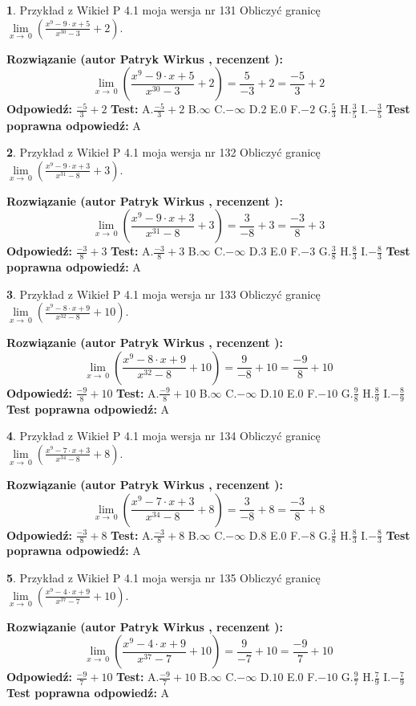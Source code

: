 \documentclass[12pt, a4paper]{article}
\theoremstyle{definition} %
\newtheorem{zad}{}
\newcommand{\zadStart}[1]{\begin{zad}#1\newline}
\newcommand{\zadStop}{\end{zad}}
\newcommand{\rozwStart}[2]{\noindent \textbf{Rozwiązanie (autor #1 , recenzent #2): }\newline}
\newcommand{\rozwStop}{\newline}
\newcommand{\odpStart}{\noindent \textbf{Odpowiedź:}\newline}
\newcommand{\odpStop}{\newline}
\newcommand{\testStart}{\noindent \textbf{Test:}\newline}
\newcommand{\testStop}{\newline}
\newcommand{\kluczStart}{\noindent \textbf{Test poprawna odpowiedź:}\newline}
\newcommand{\kluczStop}{\newline}
\begin{document}
\zadStart{Przykład z Wikieł P 4.1 moja wersja nr 131}
Obliczyć granicę $\lim\limits_{x\to\ 0}(\frac{x^{9}-9 \cdot x +5}{x^{30}-3}+2)$.
\zadStop
\rozwStart{Patryk Wirkus}{}
$$\lim\limits_{x\to\ 0}(\frac{x^{9}-9 \cdot x +5}{x^{30}-3}+2)=\frac{5}{-3}+2=\frac{-5}{3}+2$$
\rozwStop
\odpStart
$\frac{-5}{3}+2$
\odpStop
\testStart
A.$\frac{-5}{3}+2$
B.$\infty$
C.$-\infty$
D.$2$
E.$0$
F.$-2$
G.$\frac{5}{3}$
H.$\frac{3}{5}$
I.$-\frac{3}{5}$
\testStop
\kluczStart
A
\kluczStop



\zadStart{Przykład z Wikieł P 4.1 moja wersja nr 132}
Obliczyć granicę $\lim\limits_{x\to\ 0}(\frac{x^{9}-9 \cdot x +3}{x^{31}-8}+3)$.
\zadStop
\rozwStart{Patryk Wirkus}{}
$$\lim\limits_{x\to\ 0}(\frac{x^{9}-9 \cdot x +3}{x^{31}-8}+3)=\frac{3}{-8}+3=\frac{-3}{8}+3$$
\rozwStop
\odpStart
$\frac{-3}{8}+3$
\odpStop
\testStart
A.$\frac{-3}{8}+3$
B.$\infty$
C.$-\infty$
D.$3$
E.$0$
F.$-3$
G.$\frac{3}{8}$
H.$\frac{8}{3}$
I.$-\frac{8}{3}$
\testStop
\kluczStart
A
\kluczStop



\zadStart{Przykład z Wikieł P 4.1 moja wersja nr 133}
Obliczyć granicę $\lim\limits_{x\to\ 0}(\frac{x^{9}-8 \cdot x +9}{x^{32}-8}+10)$.
\zadStop
\rozwStart{Patryk Wirkus}{}
$$\lim\limits_{x\to\ 0}(\frac{x^{9}-8 \cdot x +9}{x^{32}-8}+10)=\frac{9}{-8}+10=\frac{-9}{8}+10$$
\rozwStop
\odpStart
$\frac{-9}{8}+10$
\odpStop
\testStart
A.$\frac{-9}{8}+10$
B.$\infty$
C.$-\infty$
D.$10$
E.$0$
F.$-10$
G.$\frac{9}{8}$
H.$\frac{8}{9}$
I.$-\frac{8}{9}$
\testStop
\kluczStart
A
\kluczStop



\zadStart{Przykład z Wikieł P 4.1 moja wersja nr 134}
Obliczyć granicę $\lim\limits_{x\to\ 0}(\frac{x^{9}-7 \cdot x +3}{x^{34}-8}+8)$.
\zadStop
\rozwStart{Patryk Wirkus}{}
$$\lim\limits_{x\to\ 0}(\frac{x^{9}-7 \cdot x +3}{x^{34}-8}+8)=\frac{3}{-8}+8=\frac{-3}{8}+8$$
\rozwStop
\odpStart
$\frac{-3}{8}+8$
\odpStop
\testStart
A.$\frac{-3}{8}+8$
B.$\infty$
C.$-\infty$
D.$8$
E.$0$
F.$-8$
G.$\frac{3}{8}$
H.$\frac{8}{3}$
I.$-\frac{8}{3}$
\testStop
\kluczStart
A
\kluczStop



\zadStart{Przykład z Wikieł P 4.1 moja wersja nr 135}
Obliczyć granicę $\lim\limits_{x\to\ 0}(\frac{x^{9}-4 \cdot x +9}{x^{37}-7}+10)$.
\zadStop
\rozwStart{Patryk Wirkus}{}
$$\lim\limits_{x\to\ 0}(\frac{x^{9}-4 \cdot x +9}{x^{37}-7}+10)=\frac{9}{-7}+10=\frac{-9}{7}+10$$
\rozwStop
\odpStart
$\frac{-9}{7}+10$
\odpStop
\testStart
A.$\frac{-9}{7}+10$
B.$\infty$
C.$-\infty$
D.$10$
E.$0$
F.$-10$
G.$\frac{9}{7}$
H.$\frac{7}{9}$
I.$-\frac{7}{9}$
\testStop
\kluczStart
A
\kluczStop
\end{document}
